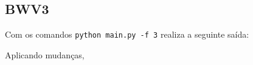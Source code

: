 
\subsection{BWV3}

Com os comandos \verb|python main.py -f 3| realiza a seguinte saída:



Aplicando mudanças, 

